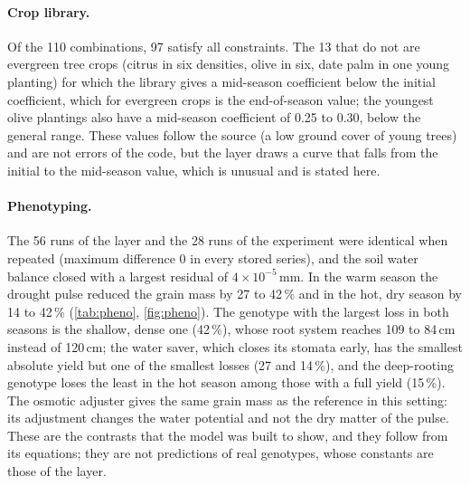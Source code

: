 \documentclass[preprint,12pt]{elsarticle}
\begin{document}
\paragraph{Crop library.} Of the 110 combinations, 97 satisfy all constraints. The 13 that do not are evergreen tree crops (citrus in six densities, olive in six, date palm in one young planting) for which the library gives a mid-season coefficient below the initial coefficient, which for evergreen crops is the end-of-season value; the youngest olive plantings also have a mid-season coefficient of 0.25 to 0.30, below the general range. These values follow the source (a low ground cover of young trees) and are not errors of the code, but the layer draws a curve that falls from the initial to the mid-season value, which is unusual and is stated here.

\paragraph{Phenotyping.} The 56 runs of the layer and the 28 runs of the experiment were identical when repeated (maximum difference 0 in every stored series), and the soil water balance closed with a largest residual of $4\times10^{-5}$\,mm. In the warm season the drought pulse reduced the grain mass by 27 to 42\,\% and in the hot, dry season by 14 to 42\,\% (\cref{tab:pheno}, \cref{fig:pheno}). The genotype with the largest loss in both seasons is the shallow, dense one (42\,\%), whose root system reaches 109 to 84\,cm instead of 120\,cm; the water saver, which closes its stomata early, has the smallest absolute yield but one of the smallest losses (27 and 14\,\%), and the deep-rooting genotype loses the least in the hot season among those with a full yield (15\,\%). The osmotic adjuster gives the same grain mass as the reference in this setting: its adjustment changes the water potential and not the dry matter of the pulse. These are the contrasts that the model was built to show, and they follow from its equations; they are not predictions of real genotypes, whose constants are those of the layer.
\end{document}
